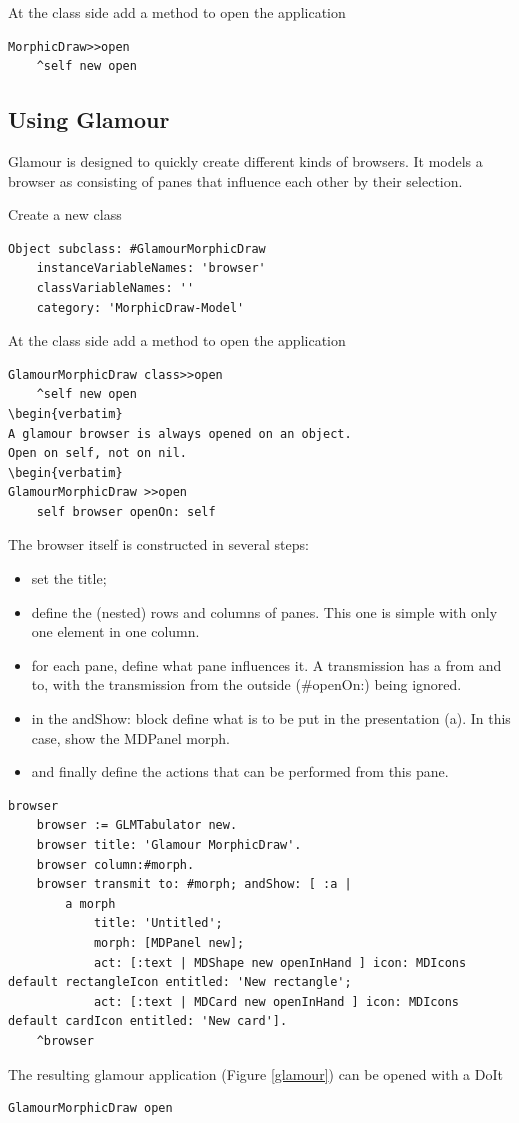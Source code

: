 \documentclass[10pt]{article}   	%
\begin{document}
At the class side add a method to open the application

\begin{verbatim}
MorphicDraw>>open
    ^self new open
\end{verbatim}
\subsection{Using Glamour}
Glamour is designed to quickly create different kinds of browsers.
It models a browser as consisting of panes that influence each other 
by their selection. 

Create a new class
\begin{verbatim}
Object subclass: #GlamourMorphicDraw
    instanceVariableNames: 'browser'
    classVariableNames: ''
    category: 'MorphicDraw-Model' 
\end{verbatim}
At the class side add a method to open the application
\begin{verbatim}
GlamourMorphicDraw class>>open
    ^self new open
\begin{verbatim}
A glamour browser is always opened on an object. 
Open on self, not on nil.
\begin{verbatim}
GlamourMorphicDraw >>open
    self browser openOn: self
\end{verbatim}
The browser itself is constructed in several steps:
\begin{itemize}
\item set the title;
\item define the (nested) rows and columns of panes.
This one is simple with only one element in one column.
\item for each pane, define what pane influences it. 
A transmission has a from and to, with the transmission from
the outside (\#openOn:) being ignored.
\item in the andShow: block define what is to be put in the
presentation (a). In this case, show the MDPanel morph.
\item and finally define the actions that can be performed
from this pane.
\end{itemize}
\begin{verbatim}
browser
    browser := GLMTabulator new.
    browser title: 'Glamour MorphicDraw'.
    browser column:#morph.
    browser transmit to: #morph; andShow: [ :a |
        a morph 
            title: 'Untitled';
            morph: [MDPanel new];
            act: [:text | MDShape new openInHand ] icon: MDIcons default rectangleIcon entitled: 'New rectangle';
            act: [:text | MDCard new openInHand ] icon: MDIcons default cardIcon entitled: 'New card'].
    ^browser
\end{verbatim}
The resulting glamour application (Figure \ref{glamour}) can be opened with a DoIt
\begin{verbatim}
GlamourMorphicDraw open
\end{verbatim}
\end{document}

